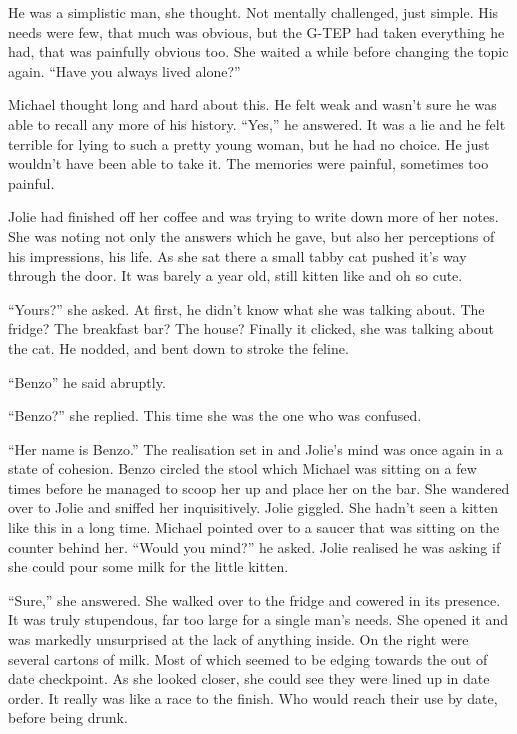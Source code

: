 He was a simplistic man, she thought.  Not mentally challenged, just simple.  His needs were few, that much was obvious, but the G-TEP had taken everything he had, that was painfully obvious too.  She waited a while before changing the topic again.  ``Have you always lived alone?''

Michael thought long and hard about this.  He felt weak and wasn't sure he was able to recall any more of his history.  ``Yes,'' he answered.  It was a lie and he felt terrible for lying to such a pretty young woman, but he had no choice.  He just wouldn't have been able to take it.  The memories  were painful, sometimes too painful.  

Jolie had finished off her coffee and was trying to write down more of her notes.  She was noting not only the answers which he gave, but also her perceptions of his impressions, his life.  As she sat there a small tabby cat pushed it's way through the door.  It was barely a year old, still kitten like and oh so cute.

``Yours?'' she asked.  At first, he didn't know what she was talking about.  The fridge?  The breakfast bar?  The house?  Finally it clicked, she was talking about the cat.  He nodded, and bent down to stroke the feline.  

``Benzo'' he said abruptly.  

``Benzo?'' she replied.  This time she was the one who was confused.

``Her name is Benzo.''  The realisation set in and Jolie's mind was once again in a state of cohesion.  Benzo circled the stool which Michael was sitting on a few times before he managed to scoop her up and place her on the bar.  She wandered over to Jolie and sniffed her inquisitively.  Jolie giggled.  She hadn't seen a kitten like this in a long time.  Michael pointed over to a saucer that was sitting on the counter behind her.  ``Would you mind?'' he asked.  Jolie realised he was asking if she could pour some milk for the little kitten.

``Sure,'' she answered.  She walked over to the fridge and cowered in its presence.  It was truly stupendous, far too large for a single man's needs.  She opened it and was markedly unsurprised at the lack of anything inside.  On the right were several cartons of milk.  Most of which seemed to be edging towards the out of date checkpoint.  As she looked closer, she could see they were lined up in date order.  It really was like a race to the finish.  Who would reach their use by date, before being drunk.  

